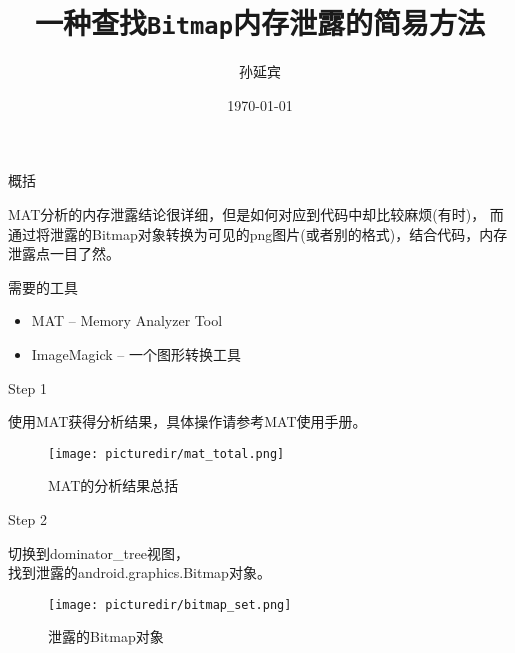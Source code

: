 \documentclass{beamer}
\title{一种查找\texttt{Bitmap}内存泄露的简易方法}
\author{孙延宾}
\institute{西安$\cdot$业务软件开发一部$\cdot$~\texttt{ZTE}}
\date{\today}
\begin{document}
  \begin{frame}[plain]
    \titlepage
  \end{frame}

  \tt

  \begin{frame}{概括}
  \begin{framedtext}
    MAT分析的内存泄露结论很详细，但是如何对应到代码中却比较麻烦(有时)，
    而通过将泄露的Bitmap对象转换为可见的png图片(或者别的格式)，结合代码，内存泄露点一目了然。
  \end{framedtext}
  \end{frame}

  \begin{frame}{需要的工具}
  \begin{framedtext}
    \begin{itemize}
      \item MAT -- Memory Analyzer Tool
      \item ImageMagick -- 一个图形转换工具
    \end{itemize}
  \end{framedtext}
  \end{frame}

  \begin{frame}{Step 1}
  \begin{framedtext}
    使用MAT获得分析结果，具体操作请参考MAT使用手册。
  \end{framedtext}
  \end{frame}

  \begin{frame}
    \begin{figure}
      \centering
      \texttt{[image: picturedir/mat\_total.png]}\\
      \caption{MAT的分析结果总括}\label{git:matresult}
    \end{figure}
  \end{frame}

  \begin{frame}{Step 2}
  \begin{framedtext}
    切换到dominator\_tree视图，\\
    找到泄露的android.graphics.Bitmap对象。
  \end{framedtext}
  \end{frame}

  \begin{frame}
    \begin{figure}
      \centering
      \texttt{[image: picturedir/bitmap\_set.png]}\\
      \caption{泄露的Bitmap对象}\label{fig:bitmap}
    \end{figure}
  \end{frame}
\end{document}
